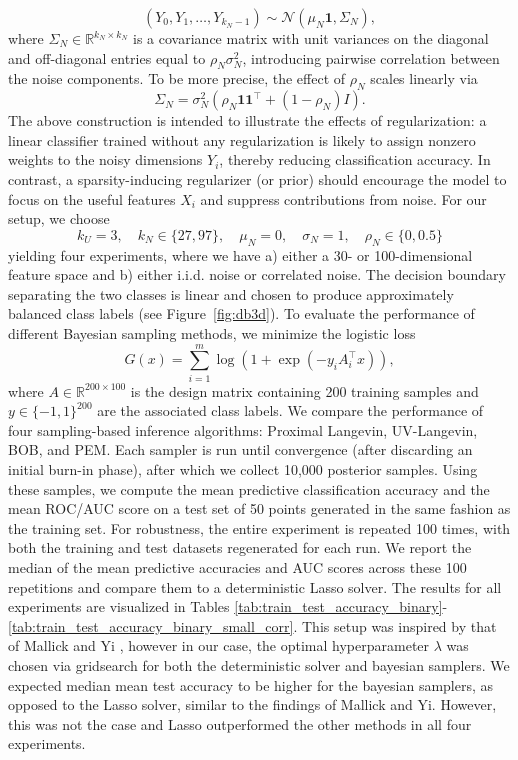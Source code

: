 \documentclass[11pt, twoside]{report}
\begin{document}
\[
(Y_0, Y_1, \dots, Y_{k_N-1}) \sim \mathcal{N}(\mu_N \mathbf{1}, \Sigma_N),
\]
where $\Sigma_N \in \mathbb{R}^{k_N \times k_N}$ is a covariance matrix with unit variances on the diagonal and off-diagonal entries equal to $\rho_N \sigma_N^2$,  introducing pairwise correlation between the noise components. To be more precise, the effect of $\rho_N$ scales linearly via
\[
\Sigma_N = \sigma_N^2 \left( \rho_N \mathbf{1} \mathbf{1}^\top + (1 - \rho_N) I \right).
\] 
The above construction is intended to illustrate the effects of regularization: a linear classifier trained without any regularization is likely to assign nonzero weights to the noisy dimensions $Y_i$, thereby reducing classification accuracy. In contrast, a sparsity-inducing regularizer (or prior) should encourage the model to focus on the useful features $X_i$ and suppress contributions from noise. For our setup, we choose
\[
k_U = 3, \quad k_N \in \{27, 97\}, \quad \mu_N = 0, \quad \sigma_N = 1, \quad \rho_N \in \{0, 0.5\}
\]
yielding four experiments, where we have a) either a 30- or 100-dimensional feature space and b) either i.i.d. noise or correlated noise. The decision boundary separating the two classes is linear and chosen to produce approximately balanced class labels (see Figure~\ref{fig:db3d}). To evaluate the performance of different Bayesian sampling methods, we minimize the logistic loss
\begin{equation} \label{eq:binary_logistic}
    G(x) = \sum_{i=1}^m \log\left(1 + \exp(-y_i A_i^\top x)\right),
\end{equation}
where $A \in \mathbb{R}^{200 \times 100}$ is the design matrix containing 200 training samples and $y \in \{-1, 1\}^{200}$ are the associated class labels. We compare the performance of four sampling-based inference algorithms: Proximal Langevin, UV-Langevin, BOB, and PEM. Each sampler is run until convergence (after discarding an initial burn-in phase), after which we collect 10,000 posterior samples. Using these samples, we compute the mean predictive classification accuracy and the mean ROC/AUC score on a test set of 50 points generated in the same fashion as the training set. For robustness, the entire experiment is repeated 100 times, with both the training and test datasets regenerated for each run. We report the median of the mean predictive accuracies and AUC scores across these 100 repetitions and compare them to a deterministic Lasso solver. The results for all experiments are visualized in Tables \ref{tab:train_test_accuracy_binary}-\ref{tab:train_test_accuracy_binary_small_corr}. This setup was inspired by that of Mallick and Yi \cite{mallick2014bayesian}, however in our case, the optimal hyperparameter $\lambda$ was chosen via gridsearch for both the deterministic solver and bayesian samplers. We expected median mean test accuracy to be higher for the bayesian samplers, as opposed to the Lasso solver, similar to the findings of Mallick and Yi. However, this was not the case and Lasso outperformed the other methods in all four experiments.
\end{document}
